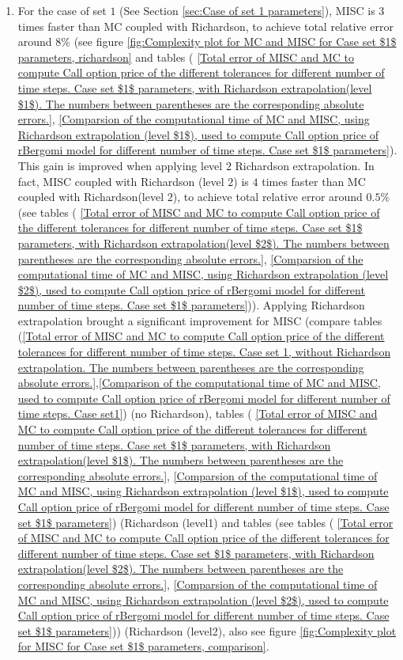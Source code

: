 \documentclass[11pt]{article}
\begin{document}
\begin{itemize}
\begin{enumerate}
		
		
	 	\item For the case of set $1$ (See Section \ref{sec:Case of set 1 parameters}), MISC  is $3$ times faster than MC coupled with Richardson, to achieve total relative error around $8\%$  (see figure \ref{fig:Complexity plot for MC and MISC for Case set $1$ parameters, richardson} and tables ( \ref{Total  error of MISC and MC to compute Call option price of the different tolerances for different number of time steps. Case set $1$ parameters, with Richardson extrapolation(level $1$). The numbers between parentheses are the corresponding absolute errors.}, \ref{Comparsion of the computational time of  MC and MISC, using Richardson extrapolation (level $1$), used to compute Call option price of rBergomi model for different number of time steps. Case set $1$ parameters}). This gain is improved when applying level $2$ Richardson extrapolation. In fact,  MISC coupled with Richardson (level $2$) is $4$ times faster than MC coupled with Richardson(level $2$), to achieve total relative error around $0.5\%$ (see  tables  ( \ref{Total  error of MISC and MC to compute Call option price of the different tolerances for different number of time steps. Case set $1$ parameters, with Richardson extrapolation(level $2$). The numbers between parentheses are the corresponding absolute errors.}, \ref{Comparsion of the computational time of  MC and MISC, using Richardson extrapolation (level $2$), used to compute Call option price of rBergomi model for different number of time steps. Case set $1$ parameters})).  Applying Richardson extrapolation brought a significant improvement for MISC (compare tables (\ref{Total error of MISC and MC to compute Call option price of the different tolerances for different number of time steps. Case set 1, without Richardson extrapolation. The numbers between parentheses are the corresponding absolute errors.},\ref{Comparison of the computational time of  MC and MISC, used to compute Call option price of rBergomi model for different number of time steps. Case set1}) (no Richardson), tables ( \ref{Total  error of MISC and MC to compute Call option price of the different tolerances for different number of time steps. Case set $1$ parameters, with Richardson extrapolation(level $1$). The numbers between parentheses are the corresponding absolute errors.}, \ref{Comparsion of the computational time of  MC and MISC, using Richardson extrapolation (level $1$), used to compute Call option price of rBergomi model for different number of time steps. Case set $1$ parameters}) (Richardson (level1) and  tables (see  tables  ( \ref{Total  error of MISC and MC to compute Call option price of the different tolerances for different number of time steps. Case set $1$ parameters, with Richardson extrapolation(level $2$). The numbers between parentheses are the corresponding absolute errors.}, \ref{Comparsion of the computational time of  MC and MISC, using Richardson extrapolation (level $2$), used to compute Call option price of rBergomi model for different number of time steps. Case set $1$ parameters})) (Richardson (level2), also see  figure \ref{fig:Complexity plot for  MISC for Case set $1$ parameters, comparison}.
	 	

\end{enumerate}
\end{itemize}
\end{document}
